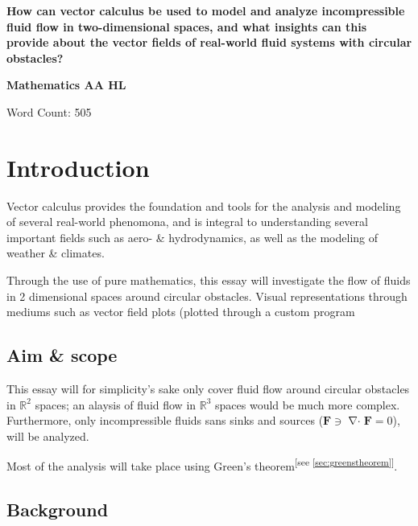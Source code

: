 \documentclass[a4paper, 12pt]{article} %
\newcommand{\researchquestion}{How can vector calculus be used to model and analyze incompressible fluid flow in two-dimensional spaces, and what insights can this provide about the vector fields of real-world fluid systems with circular obstacles?}
\newcommand{\fatf}{\mathbf{F}} %
\newcommand{\referto}[1]{\textsuperscript{\color{darkgray}\tiny[see \ref{#1}]}} %
\DeclareMathOperator{\divergence}{\nabla\cdot} %
\begin{document}
\begin{titlepage} %
	\begin{center}
		\vspace*{0.5cm}
		\Large
		\textbf{\researchquestion}

		\vspace{1.5cm}
		\large
		\textbf{Mathematics AA HL}

		\vfill{}\color{darkgray}
		Word Count: 505 %
	\end{center}
\end{titlepage}

\tableofcontents\newpage %

\section{Introduction}
Vector calculus provides the foundation and tools for the analysis and modeling of several real-world phenomona, and is integral to understanding several important fields such as aero- \& hydrodynamics, as well as the modeling of weather \& climates. 

Through the use of pure mathematics, this essay will investigate the flow of fluids in 2 dimensional spaces around circular obstacles. Visual representations through mediums such as vector field plots (plotted through a custom program
\subsection{Aim \& scope}
This essay will for simplicity's sake only cover fluid flow around circular obstacles in $\mathbb{R}^2$ spaces; an alaysis of fluid flow in $\mathbb{R}^3$ spaces would be much more complex.
Furthermore, only incompressible fluids sans sinks and sources ($\fatf\ni\divergence\fatf=0$), will be analyzed.

Most of the analysis will take place using Green's theorem\referto{sec:greenstheorem}.

\subsection{Background}
\end{document}
